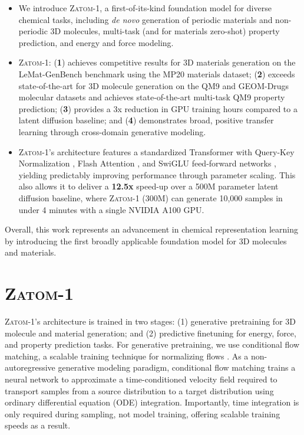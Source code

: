 \documentclass{article}
\theoremstyle{plain}
\theoremstyle{definition}
\theoremstyle{remark}
\begin{document}
\begin{itemize}[noitemsep] %
    \item We introduce \textsc{Zatom-1}, a first-of-its-kind foundation model for diverse chemical tasks, including \textit{de novo} generation of periodic materials and non-periodic 3D molecules, multi-task (and for materials zero-shot) property prediction, and energy and force modeling.
    \item \textsc{Zatom-1}: (\textbf{1}) achieves competitive results for 3D materials generation on the LeMat-GenBench benchmark using the MP20 materials dataset; (\textbf{2}) exceeds state-of-the-art for 3D molecule generation on the QM9 and GEOM-Drugs molecular datasets and achieves state-of-the-art multi-task QM9 property prediction; (\textbf{3}) provides a 3x reduction in GPU training hours compared to a latent diffusion baseline; and (\textbf{4}) demonstrates broad, positive transfer learning through cross-domain generative modeling.
    \item \textsc{Zatom-1}'s architecture features a standardized Transformer with Query-Key Normalization \citep{wortsman2024smallscale}, Flash Attention \citep{dao2024flashattention}, and SwiGLU feed-forward networks \citep{shazeer2020glu}, yielding predictably improving performance through parameter scaling. This also allows it to deliver a \textbf{12.5x} speed-up over a 500M parameter latent diffusion baseline, where \textsc{Zatom-1} (300M) can generate 10,000 samples in under 4 minutes with a single NVIDIA A100 GPU.
\end{itemize}

Overall, this work represents an advancement in chemical representation learning by introducing the first broadly applicable foundation model for 3D molecules and materials.

\section{\textsc{Zatom-1}}
\label{section:zatom_1}

\textsc{Zatom-1}'s architecture is trained in two stages: (1) generative pretraining for 3D molecule and material generation; and (2) predictive finetuning for energy, force, and property prediction tasks. 
For generative pretraining, we use conditional flow matching, a scalable training technique for normalizing flows \citep{lipman2023flow}. As a non-autoregressive generative modeling paradigm, conditional flow matching trains a neural network to approximate a time-conditioned velocity field required to transport samples from a source distribution to a target distribution using ordinary differential equation (ODE) integration. Importantly, time integration is only required during sampling, not model training, offering scalable training speeds as a result.
\end{document}
